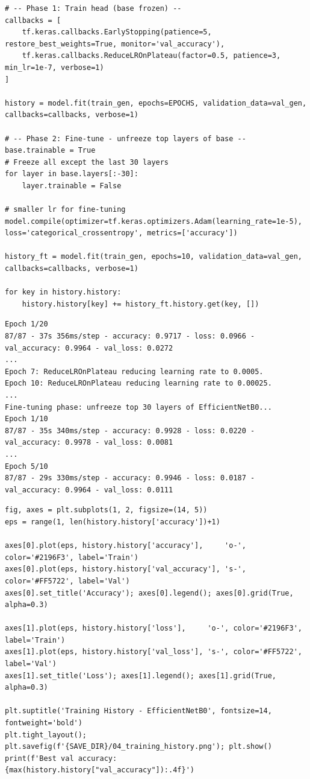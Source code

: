 \begin{lstlisting}[style=pythoncode, caption={Chạy huấn luyện Phase 1 (Frozen) và Phase 2 (Fine-tuning)}]
# -- Phase 1: Train head (base frozen) --
callbacks = [
    tf.keras.callbacks.EarlyStopping(patience=5, restore_best_weights=True, monitor='val_accuracy'),
    tf.keras.callbacks.ReduceLROnPlateau(factor=0.5, patience=3, min_lr=1e-7, verbose=1)
]

history = model.fit(train_gen, epochs=EPOCHS, validation_data=val_gen, callbacks=callbacks, verbose=1)

# -- Phase 2: Fine-tune - unfreeze top layers of base --
base.trainable = True
# Freeze all except the last 30 layers
for layer in base.layers[:-30]:
    layer.trainable = False

# smaller lr for fine-tuning
model.compile(optimizer=tf.keras.optimizers.Adam(learning_rate=1e-5), loss='categorical_crossentropy', metrics=['accuracy'])

history_ft = model.fit(train_gen, epochs=10, validation_data=val_gen, callbacks=callbacks, verbose=1)

for key in history.history:
    history.history[key] += history_ft.history.get(key, [])
\end{lstlisting}

\begin{lstlisting}[style=consoleoutput, caption={Output: Log kết quả học của mô hình}]
Epoch 1/20
87/87 - 37s 356ms/step - accuracy: 0.9717 - loss: 0.0966 - val_accuracy: 0.9964 - val_loss: 0.0272
...
Epoch 7: ReduceLROnPlateau reducing learning rate to 0.0005.
Epoch 10: ReduceLROnPlateau reducing learning rate to 0.00025.
...
Fine-tuning phase: unfreeze top 30 layers of EfficientNetB0...
Epoch 1/10
87/87 - 35s 340ms/step - accuracy: 0.9928 - loss: 0.0220 - val_accuracy: 0.9978 - val_loss: 0.0081
...
Epoch 5/10
87/87 - 29s 330ms/step - accuracy: 0.9946 - loss: 0.0187 - val_accuracy: 0.9964 - val_loss: 0.0111
\end{lstlisting}

\begin{lstlisting}[style=pythoncode, caption={Vẽ biểu đồ tích hợp lịch sử huấn luyện}]
fig, axes = plt.subplots(1, 2, figsize=(14, 5))
eps = range(1, len(history.history['accuracy'])+1)

axes[0].plot(eps, history.history['accuracy'],     'o-', color='#2196F3', label='Train')
axes[0].plot(eps, history.history['val_accuracy'], 's-', color='#FF5722', label='Val')
axes[0].set_title('Accuracy'); axes[0].legend(); axes[0].grid(True, alpha=0.3)

axes[1].plot(eps, history.history['loss'],     'o-', color='#2196F3', label='Train')
axes[1].plot(eps, history.history['val_loss'], 's-', color='#FF5722', label='Val')
axes[1].set_title('Loss'); axes[1].legend(); axes[1].grid(True, alpha=0.3)

plt.suptitle('Training History - EfficientNetB0', fontsize=14, fontweight='bold')
plt.tight_layout(); plt.savefig(f'{SAVE_DIR}/04_training_history.png'); plt.show()
print(f'Best val accuracy: {max(history.history["val_accuracy"]):.4f}')
\end{lstlisting}

